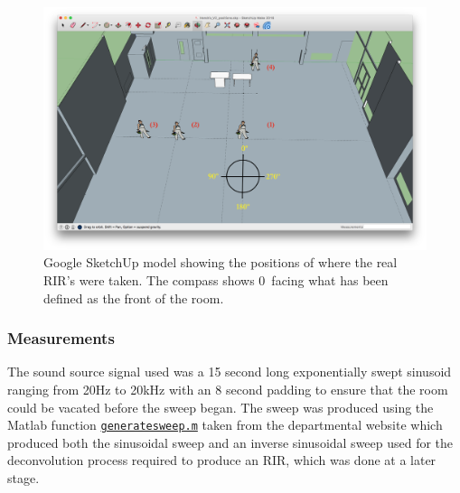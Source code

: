 \documentclass[../../main.tex]{subfiles}
\begin{document}
		\begin{figure}
			\begin{center}
				\includegraphics[width=\textwidth]{Sections/Implementation/RealRIRs/images/Real_RIRs7_editV2.png} 
				\caption{Google SketchUp model showing the positions of where the real \ac{RIR}'s were taken. The compass shows 0\textdegree~facing what has been defined as the front of the room.}
				\label{rirPositions}
			\end{center}
		\end{figure}

	\subsubsection{Measurements}
		The sound source signal used was a 15 second long exponentially swept sinusoid ranging from 20Hz to 20kHz with an 8 second padding to ensure that the room could be vacated before the sweep began. The sweep was produced using the Matlab function \href{http://lt669.github.io/code/matlab/html/generatesweep.html}{\texttt{generatesweep.m}} taken from the departmental website \cite{sineSweep} which produced both the sinusoidal sweep and an inverse sinusoidal sweep used for the deconvolution process required to produce an \ac{RIR}, which was done at a later stage.
		
\end{document}
